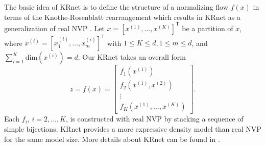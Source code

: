 


The basic idea of KRnet is to define the structure of a normalizing flow $f({x})$ in terms of the Knothe-Rosenblatt rearrangement which results in KRnet as a generalization of real NVP \cite{dinh2016density}. Let ${x} = \left[{x}^{(1)}, \ldots, {x}^{(K)}\right]^\mathsf{T}$ be a partition of ${x}$, where ${x}^{(i)} =\left[x_{1}^{(i)}, \ldots, x_{m}^{(i)}\right]^\mathsf{T}$ with $1 \leq K \leq d, 1 \leq m \leq d$, and $\sum_{i=1}^K \mathrm{dim}\left({x}^{(i)}\right) = d$. Our KRnet takes an overall form
\begin{equation} \label{eqn_KR}
  {z} = f({x}) = \left[ 
    \begin{array}{l}
    f_1\left({x}^{(1)}\right) \\
    f_2\left({x}^{(1)}, {x}^{(2)}\right) \\
    \vdots \\
    f_{K}\left({x}^{(1)}, \ldots, {x}^{(K)}\right)
    \end{array}
    \right].
\end{equation}
Each $f_{i}$, $i=2,\ldots,K$, is constructed with real NVP by stacking a sequence of simple bijections. KRnet provides a more expressive density model than real NVP for the same model size. More details about KRnet can be found in \cite{tang2020deep,adda_2022}.

